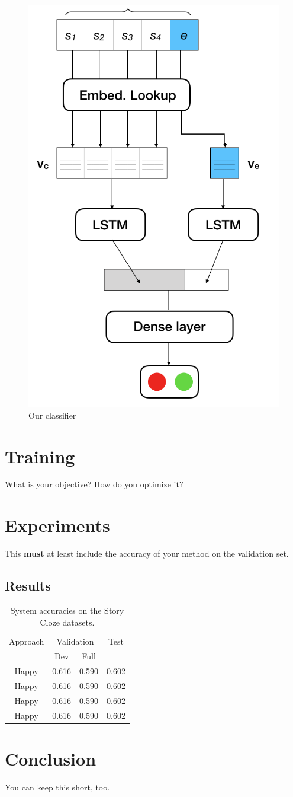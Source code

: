 \documentclass{article}
\begin{document}
\begin{figure}
  \centering
  \includegraphics[width=0.5 \linewidth]{fig/ourmodel.PNG}
  \caption{Our classifier}
  \label{Figure:model}
\end{figure}

\section{Training}
What is your objective? How do you optimize it?

\section{Experiments}
This {\bf must} at least include the accuracy of your method on the validation set.

\subsection{Results}
\begin{table}[h]
  \centering
  \begin{tabular}{ c c c c}
    \toprule
    Approach &  \multicolumn{2}{c}{Validation} & Test \\
     &  Dev & Full &  \\
    \midrule
    Happy & 0.616 & 0.590& 0.602\\
    Happy & 0.616 & 0.590& 0.602\\
    Happy & 0.616 & 0.590& 0.602\\
    Happy & 0.616 & 0.590& 0.602\\

    \bottomrule
  \end{tabular}
  \label{Tab:results}
  \caption{System accuracies on the Story Cloze datasets. }
\end{table}

\section{Conclusion}
You can keep this short, too.
\end{document}

